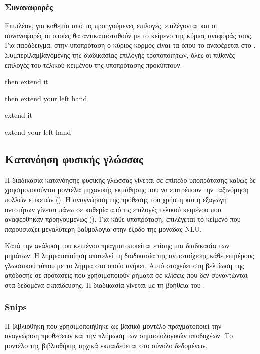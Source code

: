 \subsubsection{Συναναφορές}
Επιπλέον, για καθεμία από τις προηγούμενες επιλογές, επιλέγονται και οι συναναφορές οι οποίες θα αντικατασταθούν με το κείμενο της κύριας αναφοράς τους.
Για παράδειγμα, στην υποπρόταση
ο κύριος κορμός είναι τα \engquote{[V: extend] [ARG1: it]} όπου το  αναφέρεται στο .
Συμπεριλαμβανόμενης της διαδικασίας επιλογής τροποποιητών, όλες οι πιθανές επιλογές του τελικού κειμένου της υποπρότασης προκύπτουν:
\begin{compactenum}
    \item{then extend it}
    \item{then extend your left hand}
    \item{extend it}
    \item{extend your left hand}
\end{compactenum}

\subsection{Κατανόηση φυσικής γλώσσας}\label{subsec:4-NLU}
Η διαδικασία κατανόησης φυσικής γλώσσας γίνεται σε επίπεδο υποπρότασης καθώς δε χρησιμοποιούνται μοντέλα μηχανικής εκμάθησης που να επιτρέπουν την ταξινόμηση πολλών ετικετών ().
Η αναγνώριση της πρόθεσης του χρήστη και η εξαγωγή οντοτήτων γίνεται πάνω σε καθεμία από τις επιλογές τελικού κειμένου που αναφέρθηκαν προηγουμένως ().
Για κάθε υποπρόταση, επιλέγεται το κείμενο που παρουσιάζει μεγαλύτερη βαθμολογία στην έξοδο της μονάδας NLU.

Κατά την ανάλυση του κειμένου πραγματοποιείται επίσης μια διαδικασία  των ρημάτων.
Η λημματοποίηση αποτελεί τη διαδικασία της αντιστοίχισης κάθε επιμέρους γλωσσικού τύπου με το λήμμα στο οποίο ανήκει.
Αυτό στοχεύει στη βελτίωση της απόδοσης σε προτάσεις που χρησιμοποιούν ρήματα σε κλίσεις που δεν συναντώνται στα δεδομένα εκπαίδευσης.
Η διαδικασία γίνεται με τη βοήθεια του .

\subsubsection{Snips}\label{subsec:4-snips}
Η βιβλιοθήκη  που χρησιμοποιήθηκε ως βασικό μοντέλο πραγματοποιεί την αναγνώριση προθέσεων και την πλήρωση των σημασιολογικών υποδοχέων.
Το μοντέλο της βιβλιοθήκης αρχικά εκπαιδεύεται στο σύνολο δεδομένων.

